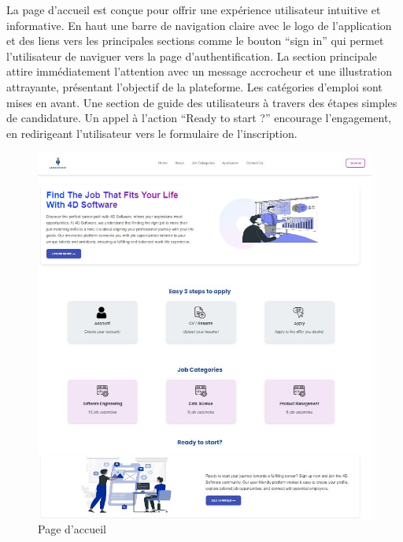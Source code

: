 La page  d’accueil est  conçue pour offrir une expérience utilisateur intuitive et informative. En haut une  barre  de navigation claire avec le logo de l’application et des liens vers les principales sections comme le bouton “sign in” qui permet l’utilisateur de  naviguer vers la page d’authentification. La section principale attire immédiatement l’attention avec un message accrocheur et une illustration attrayante, présentant l'objectif de la  plateforme. Les catégories d’emploi sont mises en  avant. Une section de guide des utilisateurs à travers des étapes simples de candidature. Un appel à l’action “Ready to start ?”  encourage l'engagement, en  redirigeant l’utilisateur vers le formulaire de  l’inscription. 
\begin{figure}[htbp]
   \centering
   \includegraphics[scale=0.6]{screens/accueil2.jpg} 
   \caption{Page d'accueil}
   \label{fig:accueil}
\end{figure}

\vspace{2cm}
